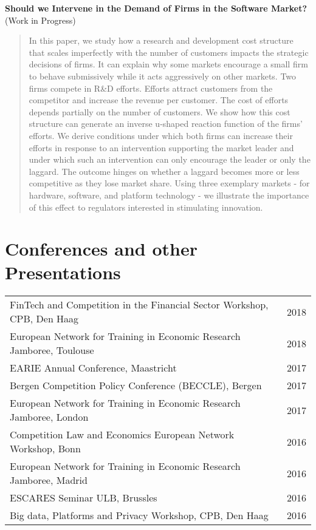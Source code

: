 \documentclass[a4paper,10pt]{article} %
\begin{document}
	\textbf{Should we Intervene in the Demand of Firms in the Software Market?}\\
	(Work in Progress)
	\begin{quotation}
		In this paper, we study how a research and development cost structure that scales imperfectly with the number of customers impacts the strategic decisions of firms. It can explain why some markets encourage a small firm to behave submissively while it acts aggressively on other markets. Two firms compete in R\&D efforts. Efforts attract customers from the competitor and increase the revenue per customer. The cost of efforts depends partially on the number of customers. We show how this cost structure can generate an inverse u-shaped reaction function of the firms' efforts. We derive conditions under which both firms can increase their efforts in response to an intervention supporting the market leader and under which such an intervention can only encourage the leader or only the laggard. The outcome hinges on whether a laggard becomes more or less competitive as they lose market share. Using three exemplary markets - for hardware, software, and platform technology - we illustrate the importance of this effect to regulators interested in stimulating innovation.
	\end{quotation}
		



\section{Conferences and other Presentations }

\begin{tabular}{p{12cm}r}
	FinTech and Competition in the Financial Sector Workshop, CPB, Den Haag &2018\\
	European Network for Training in Economic Research Jamboree, Toulouse&2018\\
	EARIE Annual Conference, Maastricht &2017\\
	Bergen Competition Policy Conference (BECCLE), Bergen&2017\\
	European Network for Training in Economic Research Jamboree, London&2017\\
	Competition Law and Economics European Network Workshop, Bonn&2016\\
	European Network for Training in Economic Research Jamboree, Madrid &2016\\
	ESCARES Seminar ULB, Brussles& 2016\\
	Big data, Platforms and Privacy Workshop, CPB, Den Haag &2016
\end{tabular}





\vfill
\end{document}
